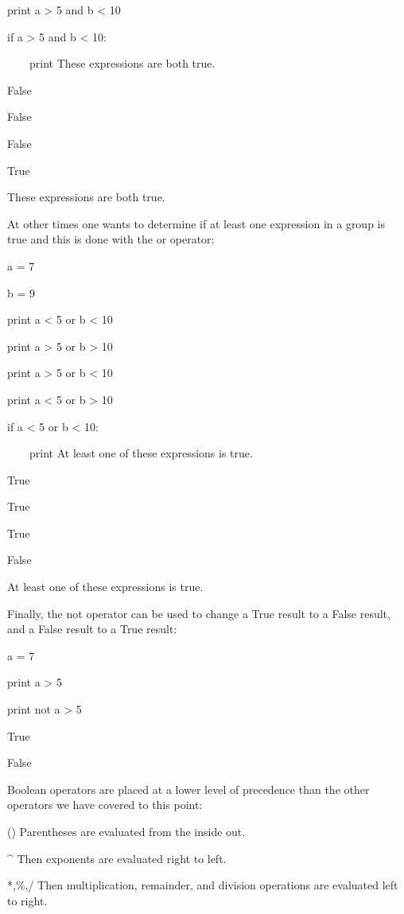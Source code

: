 \documentclass[12pt,oneside]{book}
\begin{document}
print a {\textgreater} 5 and b {\textless} 10

if a {\textgreater} 5 and b {\textless} 10:

\ \ \ \ print {\textquotedbl}These expressions are both
true.{\textquotedbl}

{\textbar}

False

False

False

True

These expressions are both true.


At other times one wants to determine if at least one expression in a group is true and this is done with the or operator: 

a = 7

b = 9

print a {\textless} 5 or b {\textless} 10

print a {\textgreater} 5 or b {\textgreater} 10

print a {\textgreater} 5 or b {\textless} 10

print a {\textless} 5 or b {\textgreater} 10


if a {\textless} 5 or b {\textless} 10:

\ \ \ \ print {\textquotedbl}At least one of these expressions is
true.{\textquotedbl}

{\textbar}

True

True

True

False

At least one of these expressions is true.

Finally, the not operator can be used to change a True result to a False result, and a False result to a True result: 

a = 7

print a {\textgreater} 5

print not a {\textgreater} 5

{\textbar}

True

False

Boolean operators are placed at a lower level of precedence than the other operators we have covered to this point:


() Parentheses are evaluated from the inside out.


\^{} Then exponents are evaluated right to left.


*,\%,/ Then multiplication, remainder, and division operations are evaluated left to right. 
\end{document}

